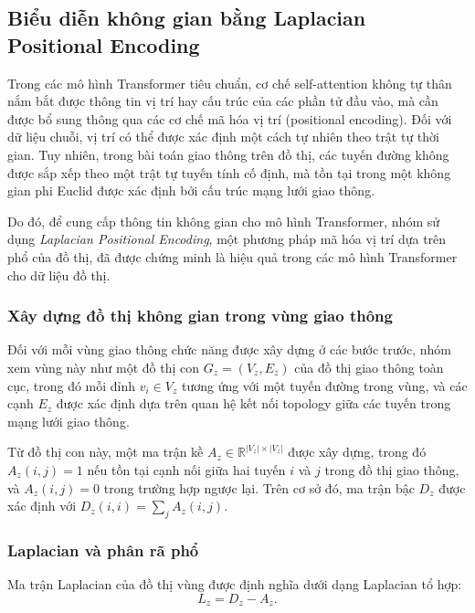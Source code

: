 \subsection{Biểu diễn không gian bằng Laplacian Positional Encoding}
\label{subsec:laplacian_pe}

Trong các mô hình Transformer tiêu chuẩn, cơ chế self-attention không tự thân nắm bắt được
thông tin vị trí hay cấu trúc của các phần tử đầu vào, mà cần được bổ sung thông qua các cơ
chế mã hóa vị trí (positional encoding). Đối với dữ liệu chuỗi, vị trí có thể được xác định
một cách tự nhiên theo trật tự thời gian. Tuy nhiên, trong bài toán giao thông trên đồ thị,
các tuyến đường không được sắp xếp theo một trật tự tuyến tính cố định, mà tồn tại trong
một không gian phi Euclid được xác định bởi cấu trúc mạng lưới giao thông.

Do đó, để cung cấp thông tin không gian cho mô hình Transformer, nhóm sử dụng
\textit{Laplacian Positional Encoding}, một phương pháp mã hóa vị trí dựa trên phổ của đồ
thị, đã được chứng minh là hiệu quả trong các mô hình Transformer cho dữ liệu đồ thị.

\subsubsection{Xây dựng đồ thị không gian trong vùng giao thông}
\label{subsubsec:zone_graph}

Đối với mỗi vùng giao thông chức năng được xây dựng ở các bước trước, nhóm xem vùng
này như một đồ thị con $G_z = (V_z, E_z)$ của đồ thị giao thông toàn cục, trong đó mỗi đỉnh
$v_i \in V_z$ tương ứng với một tuyến đường trong vùng, và các cạnh $E_z$ được xác định
dựa trên quan hệ kết nối topology giữa các tuyến trong mạng lưới giao thông.

Từ đồ thị con này, một ma trận kề $A_z \in \mathbb{R}^{|V_z| \times |V_z|}$ được xây dựng,
trong đó $A_z(i,j) = 1$ nếu tồn tại cạnh nối giữa hai tuyến $i$ và $j$ trong đồ thị giao
thông, và $A_z(i,j) = 0$ trong trường hợp ngược lại. Trên cơ sở đó, ma trận bậc
$D_z$ được xác định với $D_z(i,i) = \sum_j A_z(i,j)$.

\subsubsection{Laplacian và phân rã phổ}
\label{subsubsec:laplacian_eigendecomposition}

Ma trận Laplacian của đồ thị vùng được định nghĩa dưới dạng Laplacian tổ hợp:
\begin{equation}
L_z = D_z - A_z.
\end{equation}

